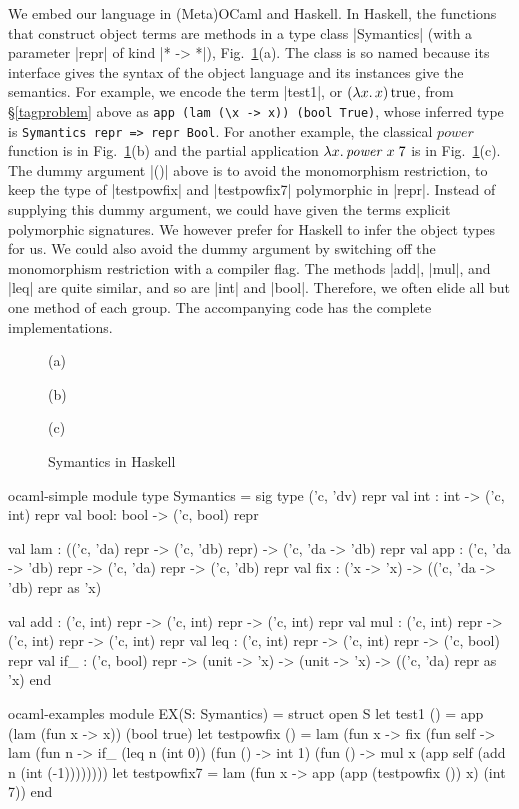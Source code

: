 We embed our language in (Meta)OCaml and Haskell.  In Haskell,
the functions that construct object terms are methods in a type class
|Symantics| (with a parameter |repr| of kind |* -> *|)\ifshort,
Fig.~\ref{fig:symantics-haskell}(a)\fi. The class is so named
because its interface gives the syntax of the object language and its
instances give the semantics.
\ifshort\else{}\fi
For example, we encode the term |test1|, or $(\mathopen{\lambda\mathord{x}.\,}x)\mathinner{\mathrm{true}}$, from
\S\ref{tagproblem} above as \texttt{app (lam (\textbackslash x -> x)) (bool True)},
whose inferred type is \texttt{Symantics repr => repr Bool}.
For another example, the classical $\mathit{power}$ function is
\ifshort in Fig.~\ref{fig:symantics-haskell}(b)
\else{}\fi
and the partial application $\mathopen{\lambda\mathord{x}.\,} \mathit{power}\;x\;7$ is
\ifshort in Fig.~\ref{fig:symantics-haskell}(c).
\else{}\fi
The dummy argument |()| above is to avoid the monomorphism
restriction, to keep the type of |testpowfix| and |testpowfix7|
polymorphic in |repr|. \ifshort\else Instead of supplying this dummy
argument, we could have given the terms explicit polymorphic
signatures.  We however prefer for
Haskell to infer the object types for us. We could also
avoid the dummy argument by switching off the monomorphism restriction
with a compiler flag. \fi
The methods |add|, |mul|, and |leq| are quite similar, and so are
|int| and |bool|. Therefore, we often elide all but
one method of each group. The
accompanying code has the complete implementations.

\ifshort
\begin{figure}
(a) 

\smallskip
(b) 

\smallskip
(c) 

\medskip
\caption{Symantics in Haskell}
\label{fig:symantics-haskell}
\end{figure}
\fi

\begin{SaveVerbatim}{ocaml-simple}
module type Symantics = sig type ('c, 'dv) repr
  val int : int  -> ('c, int) repr
  val bool: bool -> ('c, bool) repr

  val lam : (('c, 'da) repr -> ('c, 'db) repr) -> ('c, 'da -> 'db) repr
  val app : ('c, 'da -> 'db) repr -> ('c, 'da) repr -> ('c, 'db) repr
  val fix : ('x -> 'x) -> (('c, 'da -> 'db) repr as 'x)

  val add : ('c, int) repr -> ('c, int) repr -> ('c, int) repr
  val mul : ('c, int) repr -> ('c, int) repr -> ('c, int) repr
  val leq : ('c, int) repr -> ('c, int) repr -> ('c, bool) repr
  val if_ : ('c, bool) repr
            -> (unit -> 'x) -> (unit -> 'x) -> (('c, 'da) repr as 'x)
end
\end{SaveVerbatim}
\begin{SaveVerbatim}{ocaml-examples}
module EX(S: Symantics) = struct open S
  let test1 () = app (lam (fun x -> x)) (bool true)
  let testpowfix () =
       lam (fun x -> fix (fun self -> lam (fun n ->
        if_ (leq n (int 0)) (fun () -> int 1)
            (fun () -> mul x (app self (add n (int (-1))))))))
  let testpowfix7 = lam (fun x -> app (app (testpowfix ()) x) (int 7))
end
\end{SaveVerbatim}

